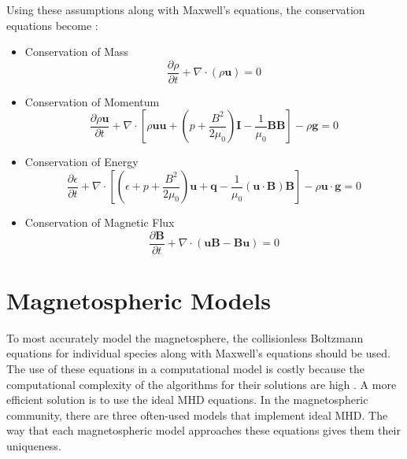 Using these assumptions along with Maxwell's equations, the conservation equations become \citep{Kominsky}:
\begin{itemize}
  \item Conservation of Mass
  $$ \frac{\partial \rho}{\partial t} + \nabla \cdot (\rho \mathbf{u}) = 0$$
  \item Conservation of Momentum
  $$ \frac{\partial \rho \mathbf{u}}{\partial t} + \nabla \cdot \left[\rho
  \mathbf{uu} + (p + \frac{B^2}{2\mu_0})\mathbf{I} - \frac{1}{\mu_0}
  \mathbf{BB}\right]- \rho \mathbf{g} = 0$$
  \item Conservation of Energy
  $$ \frac{\partial \epsilon}{\partial t} + \nabla \cdot \left[( \epsilon + p +
  \frac{B^2}{2\mu_0})\mathbf{u} + \mathbf{q} - \frac{1}{\mu_0}(\mathbf{u} \cdot
  \mathbf{B}) \mathbf{B}\right] - \rho \mathbf{u} \cdot \mathbf{g} = 0 $$
  \item Conservation of Magnetic Flux
  $$ \frac{\partial \mathbf{B}}{\partial t} + \nabla \cdot (\mathbf{uB} - \mathbf{Bu}) = 0 $$
\end{itemize}

\section{Magnetospheric Models}
To most accurately model the magnetosphere, the collisionless Boltzmann equations for individual species
along with Maxwell's equations should be used. The use of these equations in a
computational model is costly because the computational complexity of the
algorithms for their solutions are high \citep{Raeder2003}. A more efficient solution is
to use the ideal MHD equations. In the magnetospheric community, there are three
often-used models that implement ideal MHD. The way that each magnetospheric
model approaches these equations gives them their uniqueness.

